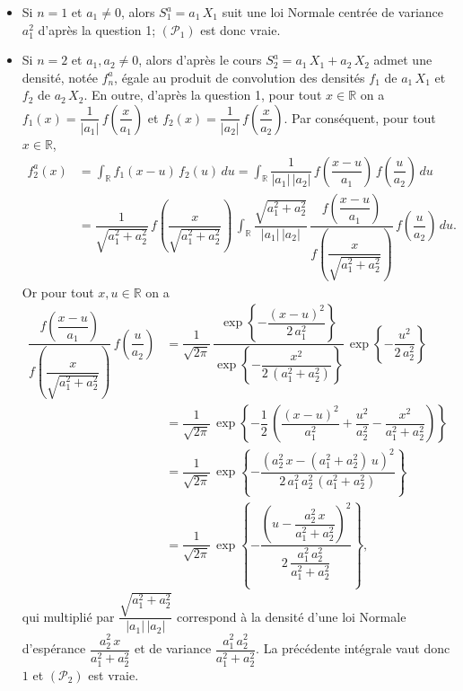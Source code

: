 \begin{itemize}
\item
  Si \(n = 1\) et \(a_1 \neq 0\), alors \(S_1^a = a_1\,X_1\) suit une
  loi Normale centrée de variance \(a_1^2\) d'après la question 1;
  \((\mathcal{P}_1)\) est donc vraie.
\item
  Si \(n=2\) et \(a_1,a_2 \neq 0\), alors d'après le cours
  \(S_2^a = a_1\,X_1 + a_2\,X_2\) admet une densité, notée \(f_n^a\),
  égale au produit de convolution des densités \(f_1\) de \(a_1\,X_1\)
  et \(f_2\) de \(a_2\,X_2\). En outre, d'après la question 1, pour tout
  \(x\in\mathbb{R}\) on a
  \(f_1(x) = \dfrac{1}{|a_1|}\,f\left(\dfrac{x}{a_1} \right)\) et
  \(f_2(x) = \dfrac{1}{|a_2|}\,f\left(\dfrac{x}{a_2} \right)\). Par
  conséquent, pour tout \(x\in\mathbb{R}\), \begin{align*}
  f_2^a(x) &= \int_{\mathbb{R}} f_1(x-u)\,f_2(u)\,du = \int_\mathbb{R}\dfrac{1}{|a_1|\,|a_2|}\,f\left(\dfrac{x - u}{a_1}\right)\,f\left(\dfrac{u}{a_2}\right)\,du\\
  &= \dfrac{1}{\sqrt{a_1^2 +a_2^2}}\,f\left(\dfrac{x}{\sqrt{a_1^2+a_2^2}}\right)\, \int_{\mathbb{R}} \dfrac{\sqrt{a_1^2+a_2^2}}{|a_1|\,|a_2|}\,\dfrac{f\left(\dfrac{x - u}{a_1}\right)}{f\left(\dfrac{x}{\sqrt{a_1^2+a_2^2}}\right)}\,f\left(\dfrac{u}{a_2}\right)\,du.
  \end{align*} Or pour tout \(x,u\in\mathbb{R}\) on a \begin{align*}
  \dfrac{f\left(\dfrac{x - u}{a_1}\right)}{f\left(\dfrac{x}{\sqrt{a_1^2+a_2^2}}\right)}\,f\left(\dfrac{u}{a_2}\right) & = \dfrac{1}{\sqrt{2\pi}}\,\dfrac{\exp\left\{-\dfrac{(x-u)^2}{2\,a_1^2} \right\}}{\exp\left\{ -\dfrac{x^2}{2\,(a_1^2+a_2^2)} \right\}}\,\exp\left\{ -\dfrac{u^2}{2\,a_2^2} \right\}\\
  & = \dfrac{1}{\sqrt{2\pi}}\,\exp\left\{-\dfrac{1}{2}\,\left( \dfrac{(x-u)^2}{a_1^2} + \dfrac{u^2}{a_2^2} - \dfrac{x^2}{a_1^2+a_2^2} \right) \right\}\\
  &= \dfrac{1}{\sqrt{2\pi}}\,\exp\left\{ -\dfrac{\left(a_2^2\,x - (a_1^2 + a_2^2)\,u\right)^2}{2\,a_1^2\,a_2^2\,(a_1^2+a_2^2)} \right\}\\
  &= \dfrac{1}{\sqrt{2\pi}}\,\exp\left\{-\dfrac{\left(u - \dfrac{a_2^2\,x}{a_1^2 + a_2^2}\right)^2}{2\,\dfrac{a_1^2\,a_2^2}{a_1^2+a_2^2}}\right\},
  \end{align*} qui multiplié par
  \(\dfrac{\sqrt{a_1^2+a_2^2}}{|a_1|\,|a_2|}\) correspond à la densité
  d'une loi Normale d'espérance \(\dfrac{a_2^2\,x}{a_1^2+a_2^2}\) et de
  variance \(\dfrac{a_1^2\,a_2^2}{a_1^2+a_2^2}\). La précédente
  intégrale vaut donc \(1\) et \((\mathcal{P}_2)\) est vraie.
\end{itemize}

